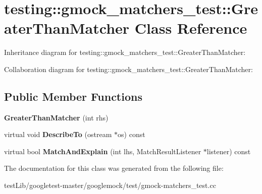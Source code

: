 \hypertarget{classtesting_1_1gmock__matchers__test_1_1GreaterThanMatcher}{}\section{testing\+:\+:gmock\+\_\+matchers\+\_\+test\+:\+:Greater\+Than\+Matcher Class Reference}
\label{classtesting_1_1gmock__matchers__test_1_1GreaterThanMatcher}


Inheritance diagram for testing\+:\+:gmock\+\_\+matchers\+\_\+test\+:\+:Greater\+Than\+Matcher\+:


Collaboration diagram for testing\+:\+:gmock\+\_\+matchers\+\_\+test\+:\+:Greater\+Than\+Matcher\+:
\subsection*{Public Member Functions}
\begin{DoxyCompactItemize}
\item 
\mbox{\label{classtesting_1_1gmock__matchers__test_1_1GreaterThanMatcher_a605c50137599a1dba0701bbd735bf1e8}} 
{\bfseries Greater\+Than\+Matcher} (int rhs)
\item 
\mbox{\label{classtesting_1_1gmock__matchers__test_1_1GreaterThanMatcher_a49ea904382d0f5b80ccf622423ab0d94}} 
virtual void {\bfseries Describe\+To} (ostream $\ast$os) const
\item 
\mbox{\label{classtesting_1_1gmock__matchers__test_1_1GreaterThanMatcher_a85a583852003638507d872238bcf7c0f}} 
virtual bool {\bfseries Match\+And\+Explain} (int lhs, Match\+Result\+Listener $\ast$listener) const
\end{DoxyCompactItemize}


The documentation for this class was generated from the following file\+:\begin{DoxyCompactItemize}
\item 
test\+Lib/googletest-\/master/googlemock/test/gmock-\/matchers\+\_\+test.\+cc\end{DoxyCompactItemize}
